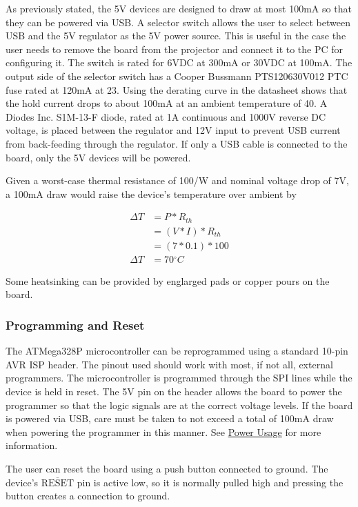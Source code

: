 \documentclass{article}
\newcommand{\degree}{\ensuremath{^{\circ}}}
\newcommand{\textoverline}[1]{$\overline{\mbox{#1}}$}
\begin{document}
As previously stated, the 5V devices are designed to draw at most 100mA so that they can be powered
via USB.  A selector switch allows the user to select between USB and the 5V regulator as the 5V
power source.  This is useful in the case the user needs to remove the board from the projector and
connect it to the PC for configuring it.  The switch is rated for 6VDC at 300mA or 30VDC at 100mA.
The output side of the selector switch has a Cooper Bussmann PTS120630V012 PTC fuse rated at 120mA
at 23\textcelsius{}.  Using the derating curve in the datasheet shows that the hold current drops to
about 100mA at an ambient temperature of 40\textcelsius{}.  A Diodes Inc. S1M-13-F diode, rated at
1A continuous and 1000V reverse DC voltage, is placed between the regulator and 12V input to prevent
USB current from back-feeding through the regulator.  If only a USB cable is connected to the board,
only the 5V devices will be powered.

Given a worst-case thermal resistance of 100\textcelsius{}/W and nominal voltage drop of 7V, a 100mA
draw would raise the device's temperature over ambient by

\begin{align*}
    \Delta T &= P * R_{th} \\
    &= (V*I) * R_{th} \\
    &= (7 * 0.1) * 100 \\
    \Delta T &= 70\degree C
\end{align*}

Some heatsinking can be provided by englarged pads or copper pours on the board.

\subsubsection{Programming and Reset} \label{sssec:ProgReset}
The ATMega328P microcontroller can be reprogrammed using a standard 10-pin AVR ISP header.  The
pinout used should work with most, if not all, external programmers.  The microcontroller is
programmed through the SPI lines while the device is held in reset.  The 5V pin on the header allows
the board to power the programmer so that the logic signals are at the correct voltage levels.  If
the board is powered via USB, care must be taken to not exceed a total of 100mA draw when powering
the programmer in this manner.  See \hyperref[ssec:PowerUsage]{Power Usage} for more information.

The user can reset the board using a push button connected to ground.  The device's
\textoverline{RESET} pin is active low, so it is normally pulled high and pressing the button
creates a connection to ground.
\end{document}
